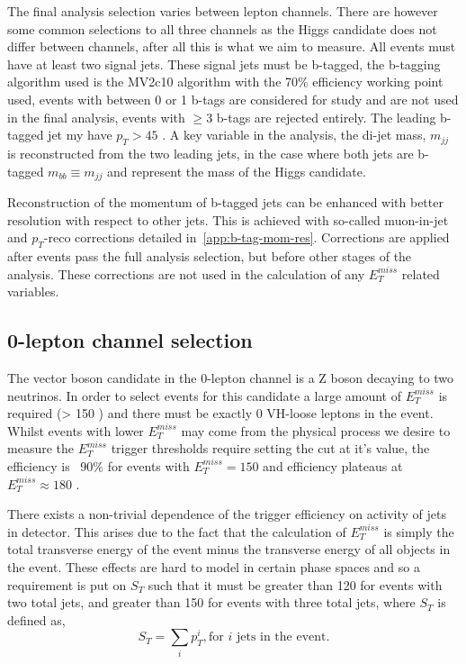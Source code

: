 The final analysis selection varies between lepton channels. There are however
some common selections to all three channels as the Higgs candidate does not
differ between channels, after all this is what we aim to measure. All events must
have at least two signal jets. These signal jets must be b-tagged, the b-tagging
algorithm used is the MV2c10 algorithm with the 70\% efficiency working point
used, events with between 0 or 1 b-tags are considered for study and are not
used in the final analysis, events with $\ge3$ b-tags are rejected entirely. The
leading b-tagged jet my have $p_T > 45$ \GeV. A key variable in the analysis, the
di-jet mass, $m_{jj}$ is reconstructed from the two leading jets, in the case
where both jets are b-tagged $m_{bb} \equiv m_{jj}$ and represent the mass of
the Higgs candidate.

Reconstruction of the momentum of b-tagged jets can be enhanced with better
resolution with respect to other jets. This is achieved with so-called
muon-in-jet and $p_T$-reco corrections detailed in~\ref{app:b-tag-mom-res}.
Corrections are applied after events pass the full analysis selection, but
before other stages of the analysis. These corrections are not used in the
calculation of any $E_T^{miss}$ related variables.

\subsection{0-lepton channel selection}
\label{sec:0lep-selection}

The vector boson candidate in the 0-lepton channel is a Z boson decaying to two
neutrinos. In order to select events for this candidate a large amount of
$E_T^{miss}$ is required (> 150 \GeV) and there must be exactly 0 VH-loose
leptons in the event. Whilst events with lower $E_T^{miss}$ may come from the
physical process we desire to measure the $E_T^{miss}$ trigger thresholds
require setting the cut at it's value, the efficiency is ~90\% for events
with $E_T^{miss} = 150$ \GeV and efficiency plateaus at $E_T^{miss} \approx 180$
\GeV.

There exists a non-trivial dependence of the trigger efficiency on activity of
jets in detector. This arises due to the fact that the calculation of
$E_T^{miss}$ is simply the total transverse energy of the event minus the
transverse energy of all objects in the event. These effects are hard to model
in certain phase spaces and so a requirement is put on $S_T$ such that it must
be greater than 120 \GeV for events with two total jets, and greater than 150 \GeV
for events with three total jets, where $S_T$ is defined as,
\begin{equation}
  S_T = \sum_i p_T^i, \text{for } i \text{ jets in the event.}
\end{equation}

